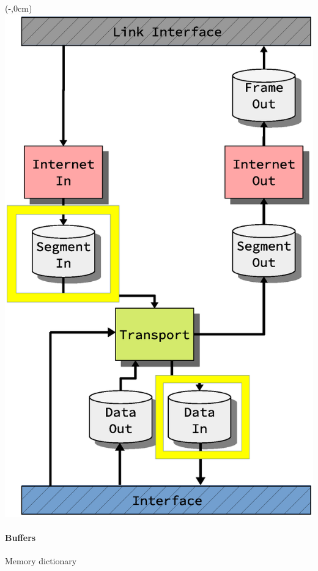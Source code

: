 \begin{frame}[t]
    \begin{textblock*}{\displayThumbnail}(\paperwidth-\displayThumbnail-0.2cm,0cm) %
        \colorbox{white}{\includegraphics[width=\textwidth]{implementation/design_2_memory_dictionary.eps}}
    \end{textblock*}
    \frametitle{\ImplementationTitle}
    \framesubtitle{Buffers}
    Memory dictionary
    \begin{columns}[t]
        \begin{column}{0.5\linewidth}
            \begin{figure}

\end{figure}
\end{column}
\end{columns}
\end{frame}
